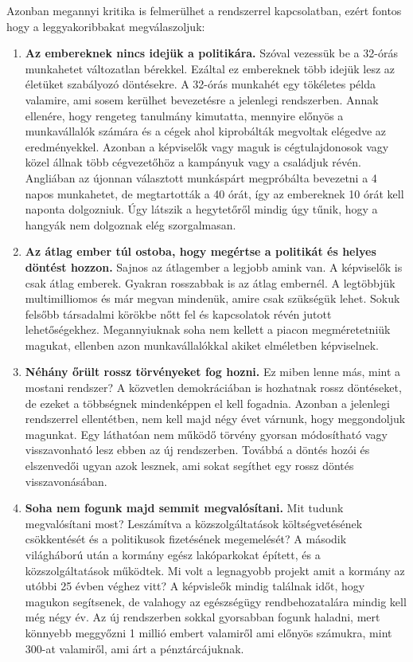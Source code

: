 Azonban megannyi kritika is felmerülhet a rendszerrel kapcsolatban, ezért fontos hogy a leggyakoribbakat
megválaszoljuk:

\begin{enumerate}

	\item \textbf{Az embereknek nincs idejük a politikára.} Szóval vezessük be a 32-órás munkahetet változatlan
	      bérekkel. Ezáltal ez embereknek több idejük lesz az életüket szabályozó döntésekre. A 32-órás munkahét egy
	      tökéletes példa valamire, ami sosem kerülhet bevezetésre a jelenlegi rendszerben. Annak ellenére, hogy
	      rengeteg tanulmány kimutatta\cite{32_hours_ww_1, 32_hours_ww_2}, mennyire előnyös a munkavállalók számára és
	      a cégek ahol kiprobálták megvoltak elégedve az eredményekkel. Azonban a képviselők vagy maguk is cégtulajdonosok
	      vagy közel állnak több cégvezetőhöz a kampányuk vagy a családjuk révén. Angliában az újonnan választott
	      munkáspárt megpróbálta bevezetni a 4 napos munkahetet, de megtartották a 40 órát, így az embereknek 10 órát
	      kell naponta dolgozniuk. Úgy látszik a hegytetőről mindig úgy tűnik, hogy a hangyák nem dolgoznak elég
	      szorgalmasan.

	\item \textbf{Az átlag ember túl ostoba, hogy megértse a politikát és helyes döntést hozzon.} Sajnos az
	      átlagember a legjobb amink van. A képviselők is csak átlag emberek. Gyakran rosszabbak is az átlag embernél.
	      A legtöbbjük multimilliomos és már megvan mindenük, amire csak szükségük lehet. Sokuk felsőbb társadalmi
		  körökbe nőtt fel és kapcsolatok révén jutott lehetőségekhez. Megannyiuknak soha nem kellett a piacon
		  megméretetniük magukat, ellenben azon munkavállalókkal akiket elméletben képviselnek. 

	\item \textbf{Néhány őrült rossz törvényeket fog hozni.} Ez miben lenne más, mint a mostani rendszer?
	      A közvetlen demokráciában is hozhatnak rossz döntéseket, de ezeket a többségnek mindenképpen el kell
	      fogadnia. Azonban a jelenlegi rendszerrel ellentétben, nem kell majd négy évet várnunk, hogy meggondoljuk
	      magunkat. Egy láthatóan nem működő törvény gyorsan módosítható vagy visszavonható lesz ebben az új rendszerben.
	      Továbbá a döntés hozói és elszenvedői ugyan azok lesznek, ami sokat segíthet egy rossz döntés visszavonásában.

	\item \textbf{Soha nem fogunk majd semmit megvalósítani.} Mit tudunk megvalósítani most? Leszámítva a
	      közszolgáltatások költségvetésének csökkentését és a politikusok fizetésének megemelését? A második
	      világháború után a kormány egész lakóparkokat épített, és a közszolgáltatások működtek. Mi volt a
	      legnagyobb projekt amit a kormány az utóbbi 25 évben véghez vitt? A képvisleők mindig találnak időt,
	      hogy magukon segítsenek, de valahogy az egészségügy rendbehozatalára mindig kell még négy év. Az új
	      rendszerben sokkal gyorsabban fogunk haladni, mert könnyebb meggyőzni 1 millió embert valamiről ami
	      előnyös számukra, mint 300-at valamiről, ami árt a pénztárcájuknak.


\end{enumerate}
